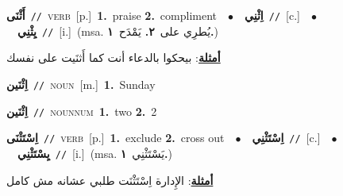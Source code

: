 \documentclass[10pt,a4paper,twoside]{article} %
\begin{document}
\begin{multicols}{2}
{\setlength\topsep{0pt}\textbf{\foreignlanguage{arabic}{أَثْنَى}}\ {\color{gray}\texttt{//}\color{black}}\ \textsc{verb}\ [p.]\ \textbf{1.}~praise  \textbf{2.}~compliment\ \ $\bullet$\ \ \setlength\topsep{0pt}\textbf{\foreignlanguage{arabic}{اِثْنِي}}\ {\color{gray}\texttt{//}\color{black}}\ [c.]\ \ $\bullet$\ \ \setlength\topsep{0pt}\textbf{\foreignlanguage{arabic}{يِثْنِي}}\ {\color{gray}\texttt{//}\color{black}}\ [i.]\ \color{gray}(msa. \foreignlanguage{arabic}{يُطرِي على}~\foreignlanguage{arabic}{\textbf{٢.}}  \foreignlanguage{arabic}{يَمْدَح}~\foreignlanguage{arabic}{\textbf{١.}})\color{black}\  \begin{flushright}\color{gray}\foreignlanguage{arabic}{\textbf{\underline{\foreignlanguage{arabic}{أمثلة}}}: بيحكوا بالدعاء أنت كما أَثنَيت على نفسك}\end{flushright}\color{black}} \vspace{2mm}

{\setlength\topsep{0pt}\textbf{\foreignlanguage{arabic}{اِثْنَين}}\ {\color{gray}\texttt{//}\color{black}}\ \textsc{noun}\ [m.]\ \textbf{1.}~Sunday\ } \vspace{2mm}

{\setlength\topsep{0pt}\textbf{\foreignlanguage{arabic}{اِثْنَين}}\ {\color{gray}\texttt{//}\color{black}}\ \textsc{noun\textunderscore num}\ \textbf{1.}~two  \textbf{2.}~2\ } \vspace{2mm}

{\setlength\topsep{0pt}\textbf{\foreignlanguage{arabic}{اِسْتَثْنَى}}\ {\color{gray}\texttt{//}\color{black}}\ \textsc{verb}\ [p.]\ \textbf{1.}~exclude  \textbf{2.}~cross out\ \ $\bullet$\ \ \setlength\topsep{0pt}\textbf{\foreignlanguage{arabic}{اِسْتَثْنِي}}\ {\color{gray}\texttt{//}\color{black}}\ [c.]\ \ $\bullet$\ \ \setlength\topsep{0pt}\textbf{\foreignlanguage{arabic}{يِسْتَثْنِي}}\ {\color{gray}\texttt{//}\color{black}}\ [i.]\ \color{gray}(msa. \foreignlanguage{arabic}{يَسْتَثْنِي}~\foreignlanguage{arabic}{\textbf{١.}})\color{black}\  \begin{flushright}\color{gray}\foreignlanguage{arabic}{\textbf{\underline{\foreignlanguage{arabic}{أمثلة}}}: الإِدارة اِسْتَثْنَت طلبي عشانه مش كامل}\end{flushright}\color{black}} \vspace{2mm}


\end{multicols}
\end{document}
